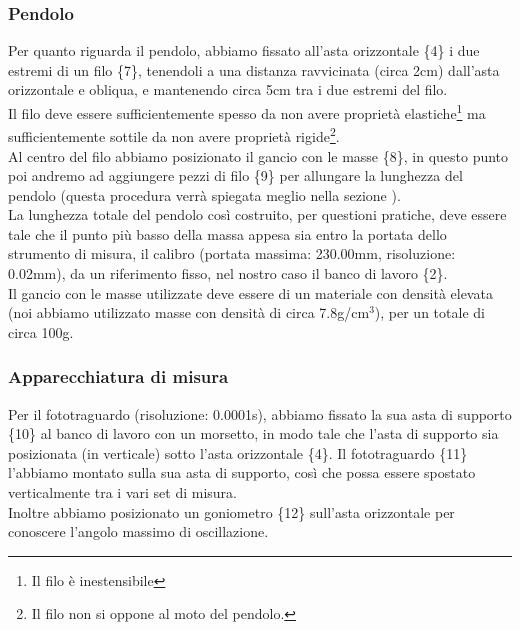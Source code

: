\subsubsection*{Pendolo}
Per quanto riguarda il pendolo, abbiamo fissato all'asta orizzontale \{4\} i due estremi di un filo \{7\}, tenendoli a una distanza ravvicinata (circa 2cm) dall'asta orizzontale e obliqua, e mantenendo circa 5cm tra i due estremi del filo.\\
Il filo deve essere sufficientemente spesso da non avere proprietà elastiche\footnote{Il filo è inestensibile} ma sufficientemente sottile da non avere proprietà rigide\footnote{Il filo non si oppone al moto del pendolo.}.\\

Al centro del filo abbiamo posizionato il gancio con le masse \{8\}, in questo punto poi andremo ad aggiungere pezzi di filo \{9\} per allungare la lunghezza del pendolo (questa procedura verrà spiegata meglio nella sezione ).\\

La lunghezza totale del pendolo così costruito, per questioni pratiche, deve essere tale che il punto più basso della massa appesa sia entro la portata dello strumento di misura, il calibro (portata massima: 230.00mm, risoluzione: 0.02mm), da un riferimento fisso, nel nostro caso il banco di lavoro \{2\}.\\
Il gancio con le masse utilizzate deve essere di un materiale con densità elevata (noi abbiamo utilizzato masse con densità di circa 7.8g/cm$^3$), per un totale di circa 100g.\\

\subsubsection*{Apparecchiatura di misura}
Per il fototraguardo (risoluzione: 0.0001s), abbiamo fissato la sua asta di supporto \{10\} al banco di lavoro con un morsetto, in modo tale che l'asta di supporto sia posizionata (in verticale) sotto l'asta orizzontale \{4\}. Il fototraguardo \{11\} l'abbiamo montato sulla sua asta di supporto, così che possa essere spostato verticalmente tra i vari set di misura.\\
Inoltre abbiamo posizionato un goniometro \{12\} sull'asta orizzontale per conoscere l'angolo massimo di oscillazione.\\
